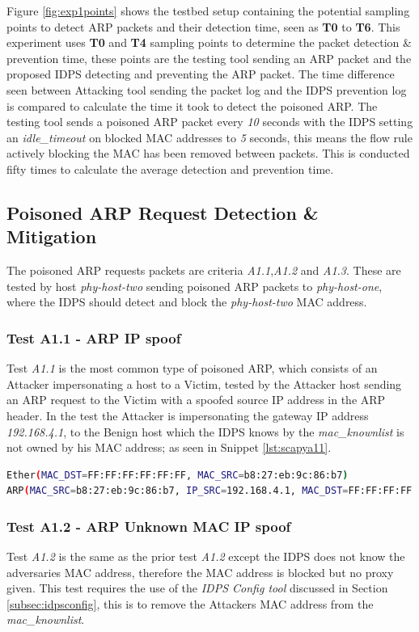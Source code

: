 \documentclass[12pt, oneside]{book}
\begin{document}
Figure \ref{fig:exp1points} shows the testbed setup containing the potential sampling points to detect ARP packets and their detection time,
seen as \textbf{T0} to \textbf{T6}. This experiment uses \textbf{T0} and \textbf{T4} sampling points to determine the packet detection \& prevention time,
these points are the testing tool sending an ARP packet and the proposed IDPS detecting and preventing the ARP packet.
The time difference seen between Attacking tool sending the packet log and the IDPS prevention log is compared to calculate
the time it took to detect the poisoned ARP.
The testing tool sends a poisoned ARP packet every \emph{10} seconds with the IDPS 
setting an \emph{idle\_timeout} on blocked MAC addresses to \emph{5} seconds, this means the flow rule actively blocking the MAC 
has been removed between packets. This is conducted fifty times to calculate the average detection and prevention time.

\subsection{Poisoned ARP Request Detection \& Mitigation}
The poisoned ARP requests packets are criteria \emph{A1.1},\emph{A1.2} and \emph{A1.3}.
These are tested by host \emph{phy-host-two} sending poisoned ARP packets to \emph{phy-host-one}, where the IDPS should detect
and block the \emph{phy-host-two} MAC address.

\subsubsection{Test A1.1 - ARP IP spoof}
Test \emph{A1.1} is the most common type of poisoned ARP, which consists of an Attacker impersonating a host to a Victim,
tested by the Attacker host sending an ARP request to the Victim with a spoofed source IP address in the ARP header.
In the test the Attacker is impersonating the gateway IP address \emph{192.168.4.1}, to
the Benign host which the IDPS knows by the \emph{mac\_knownlist} is not owned by his MAC address; as seen in Snippet \ref{lst:scapya11}.

\begin{lstlisting}[language=Bash,caption={Scapy A1.1 Test},captionpos=b,label={lst:scapya11}]
Ether(MAC_DST=FF:FF:FF:FF:FF:FF, MAC_SRC=b8:27:eb:9c:86:b7)
ARP(MAC_SRC=b8:27:eb:9c:86:b7, IP_SRC=192.168.4.1, MAC_DST=FF:FF:FF:FF:FF:FF, IP_DST=192.168.4.50)
\end{lstlisting}

\subsubsection{Test A1.2 - ARP Unknown MAC IP spoof}
Test \emph{A1.2} is the same as the prior test \emph{A1.2} except the IDPS does not know the adversaries MAC address,
therefore the MAC address is blocked but no proxy given. This test requires the use of the \emph{IDPS Config tool} discussed
in Section \ref{subsec:idpsconfig}, this is to remove the Attackers MAC address from the \emph{mac\_knownlist}.
\end{document}
